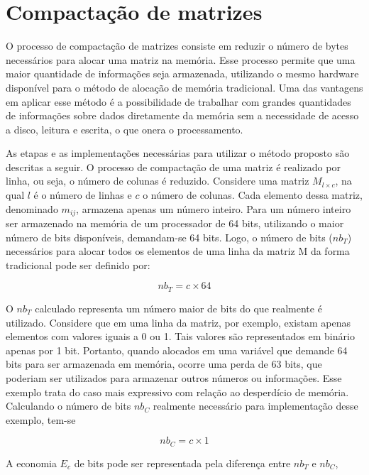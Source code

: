 \documentclass[a4paper,11pt]{article}
\begin{document}
\section{Compactação de matrizes}

O processo de compactação de matrizes consiste em reduzir o número de bytes
necessários para alocar uma matriz na memória. Esse processo permite que uma
maior quantidade de informações seja armazenada, utilizando o mesmo hardware 
disponível para o método de alocação de memória tradicional. Uma das vantagens 
em aplicar esse método é a possibilidade de trabalhar com
grandes quantidades de informações sobre dados diretamente da memória sem a
necessidade de acesso a disco, leitura e escrita, o que onera o processamento. 


As etapas e as implementações necessárias para utilizar o método proposto são
descritas a seguir. O processo de
compactação de uma matriz é realizado por linha, ou seja, 
o número de colunas é reduzido. Considere uma matriz $M_{l \times c}$, na qual
$l$ é o número de linhas e $c$ o número de colunas. Cada elemento dessa
matriz, denominado
$m_{ij}$, armazena apenas um número inteiro. Para um número inteiro ser
armazenado na memória de um processador de 64 bits, utilizando o maior número de
bits disponíveis,
demandam-se 64 bits. Logo, o número de bits ($nb_T$) necessários para
alocar todos os elementos de uma linha da matriz M da forma tradicional pode
ser definido por:

\begin{equation}
  nb_T = c \times 64
\end{equation}
 
O $nb_T$ calculado representa um número maior de bits do que realmente é utilizado. 
Considere que em uma linha da matriz, por exemplo, existam apenas elementos com valores iguais a 0 ou 1. Tais
valores são representados em binário apenas por 1 bit. Portanto, quando
alocados em uma variável que demande 64 bits para ser armazenada em memória,
ocorre uma perda de 63 bits,
que poderiam ser utilizados para armazenar outros números ou informações. Esse
exemplo trata do caso mais expressivo com relação ao desperdício de memória.
Calculando o número de bits $nb_C$ realmente necessário para implementação desse
exemplo, tem-se

\begin{equation}
  nb_C = c \times 1
\end{equation}

A economia $E_c$ de bits pode ser representada pela diferença entre $nb_T$ e $nb_C$, 
\end{document}
